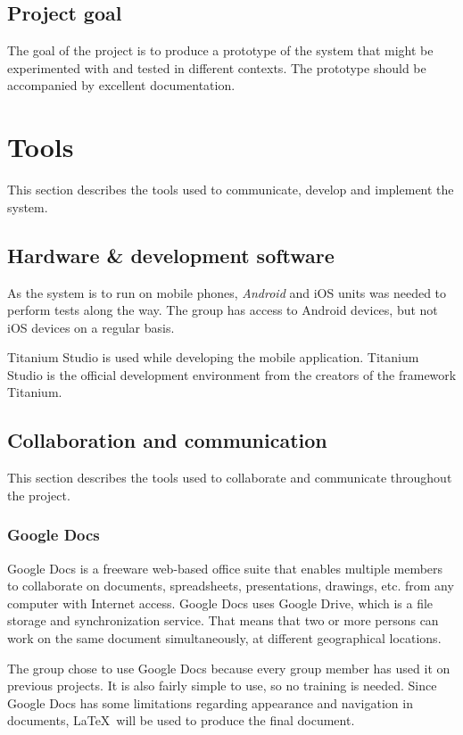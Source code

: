 \documentclass[11pt]{book}
\begin{document}
\subsection{Project goal}
The goal of the project is to produce a prototype of the system that might be experimented with and tested in different contexts. The prototype should be accompanied by excellent documentation.

\section{Tools}
This section describes the tools used to communicate, develop and implement the system.

\subsection{Hardware \& development software}
As the system is to run on mobile phones, \emph{Android} and iOS units was needed to perform tests along the way. The group has access to Android devices, but not iOS devices on a regular basis.

Titanium Studio\cite{titaniumStudio} is used while developing the mobile application. Titanium Studio is the official development environment from the creators of the framework Titanium.

\subsection{Collaboration and communication}
This section describes the tools used to collaborate and communicate throughout the project.

\subsubsection{Google Docs}
Google Docs\cite{googleDocs} is a freeware web-based office suite that enables multiple members to collaborate on documents, spreadsheets, presentations, drawings, etc. from any computer with Internet access. Google Docs uses Google Drive, which is a file storage and synchronization service. That means that two or more persons can work on the same document simultaneously, at different geographical locations. 

The group chose to use Google Docs because every group member has used it on previous projects. It is also fairly simple to use, so no training is needed. Since Google Docs has some limitations regarding appearance and navigation in documents, \LaTeX~will be used to produce the final document.
\end{document}
